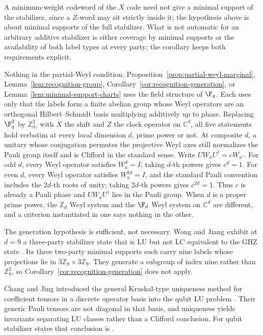 A minimum-weight codeword of the \(X\) code need not give a minimal support
of the stabilizer, since a \(Z\)-word may sit strictly inside it; the
hypothesis above is about minimal supports of the full stabilizer.  What is
not automatic for an arbitrary additive stabilizer is either coverage by
minimal supports or the availability of both label types at every party;
the corollary keeps both requirements explicit.

\begin{remark}\label{rem:arbitrary-dimension}
Nothing in the partial-Weyl condition,
Proposition~\ref{prop:partial-weyl-marginal},
Lemma~\ref{lem:recognition-group},
Corollary~\ref{cor:recognition-generation}, or
Lemma~\ref{lem:minimal-support-charts} uses the field structure of
\(\F_q\).  Each uses only that the labels form a finite abelian group whose
Weyl operators are an orthogonal Hilbert--Schmidt basis multiplying
additively up to phase.  Replacing \(\F_q^2\) by \(\mathbb Z_d^2\), with
\(X\) the shift and \(Z\) the clock operator on \(\mathbb C^d\), all five
statements hold verbatim at every local dimension \(d\), prime power or
not.  At composite \(d\), a unitary whose conjugation permutes the
projective Weyl axes still normalizes the Pauli group itself and is
Clifford in the standard sense.  Write \(UW_aU^\dagger=cW_{a'}\).  For
odd \(d\), every Weyl operator satisfies \(W_a^d=I\); taking \(d\)-th powers
gives \(c^d=1\).  For even \(d\), every Weyl operator satisfies
\(W_a^{2d}=I\), and the standard Pauli convention includes the \(2d\)-th
roots of unity; taking \(2d\)-th powers gives \(c^{2d}=1\).  Thus \(c\) is
already a Pauli phase and \(UW_aU^\dagger\) lies in the Pauli group.  When
\(d\) is a proper prime power, the
\(\mathbb Z_d\) Weyl system and the \(\F_d\) Weyl system on \(\mathbb C^d\)
are different, and a criterion instantiated in one says nothing in the
other.
\end{remark}

The generation hypothesis is sufficient, not necessary.  Wong and Jiang
exhibit at \(d=9\) a three-party stabilizer state that is LU but not LC
equivalent to the GHZ state \cite{WongJiang2025}.  Its three two-party
minimal supports each carry nine labels whose projections lie in
\(3\mathbb Z_9\times3\mathbb Z_9\).  They generate a subgroup of index
nine rather than \(\mathbb Z_9^2\), so
Corollary~\ref{cor:recognition-generation} does not apply.

Chang and Jing introduced the general Kruskal-type uniqueness method for
coefficient tensors in a discrete operator basis into the qubit LU problem
\cite{ChangJing2022}.  Their generic Pauli tensors are not diagonal in that
basis, and uniqueness yields invariants separating LU classes rather than a
Clifford conclusion.  For qubit stabilizer states that conclusion is
\cite[Theorem~1]{VanDenNestDehaeneDeMoor2005}.

